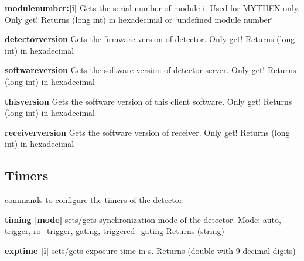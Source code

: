 \begin{DoxyItemize}
\item {\bfseries modulenumber:\mbox{[}i\mbox{]}} Gets the serial number of module i. Used for MYTHEN only. Only get! {\ttfamily Returns} {\ttfamily }(long int) in hexadecimal or \char`\"{}undefined module number\char`\"{}
\end{DoxyItemize}


\begin{DoxyItemize}
\item {\bfseries detectorversion} Gets the firmware version of detector. Only get! {\ttfamily Returns} {\ttfamily }(long int) in hexadecimal
\end{DoxyItemize}


\begin{DoxyItemize}
\item {\bfseries softwareversion} Gets the software version of detector server. Only get! {\ttfamily Returns} {\ttfamily }(long int) in hexadecimal
\end{DoxyItemize}


\begin{DoxyItemize}
\item {\bfseries thisversion} Gets the software version of this client software. Only get! {\ttfamily Returns} {\ttfamily }(long int) in hexadecimal
\end{DoxyItemize}


\begin{DoxyItemize}
\item {\bfseries receiverversion} Gets the software version of receiver. Only get! {\ttfamily Returns} {\ttfamily }(long int) in hexadecimal
\end{DoxyItemize}\hypertarget{config_configtimers}{}\subsection{Timers}\label{config_configtimers}
commands to configure the timers of the detector


\begin{DoxyItemize}
\item {\bfseries timing \mbox{[}mode\mbox{]}} sets/gets synchronization mode of the detector. Mode: auto, trigger, ro\_\-trigger, gating, triggered\_\-gating {\ttfamily Returns} {\ttfamily }(string)
\end{DoxyItemize}


\begin{DoxyItemize}
\item {\bfseries exptime \mbox{[}i\mbox{]}} sets/gets exposure time in s. {\ttfamily Returns} {\ttfamily }(double with 9 decimal digits)
\end{DoxyItemize}


